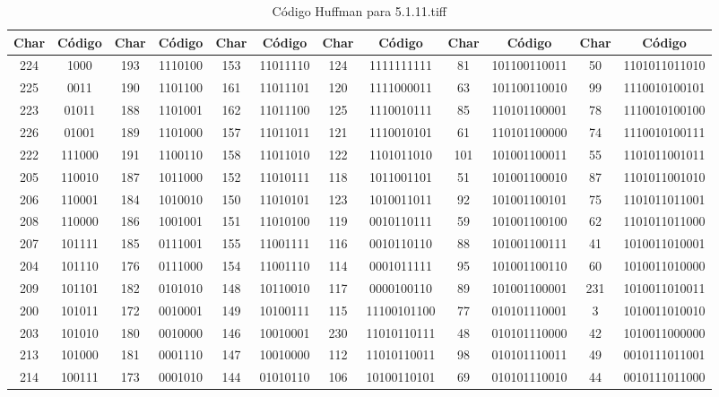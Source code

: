 \documentclass[conference,onecolumn,12pt]{IEEEtran}
\numberwithin{equation}{subsection}
\begin{document}
\begin{itemize}
    \begin{table}[H]
\centering
\caption{Código Huffman para 5.1.11.tiff}
\label{tab:huffman_5.1.11.tiff}
\begin{tabular}{cccccccccccc}
\toprule
\textbf{Char} & \textbf{Código} & \textbf{Char} & \textbf{Código} & \textbf{Char} & \textbf{Código} & \textbf{Char} & \textbf{Código} & \textbf{Char} & \textbf{Código} & \textbf{Char} & \textbf{Código} \\
\midrule
224 & 1000 & 193 & 1110100 & 153 & 11011110 & 124 & 1111111111 & 81 & 101100110011 & 50 & 1101011011010 \\
225 & 0011 & 190 & 1101100 & 161 & 11011101 & 120 & 1111000011 & 63 & 101100110010 & 99 & 1110010100101 \\
223 & 01011 & 188 & 1101001 & 162 & 11011100 & 125 & 1110010111 & 85 & 110101100001 & 78 & 1110010100100 \\
226 & 01001 & 189 & 1101000 & 157 & 11011011 & 121 & 1110010101 & 61 & 110101100000 & 74 & 1110010100111 \\
222 & 111000 & 191 & 1100110 & 158 & 11011010 & 122 & 1101011010 & 101 & 101001100011 & 55 & 1101011001011 \\
205 & 110010 & 187 & 1011000 & 152 & 11010111 & 118 & 1011001101 & 51 & 101001100010 & 87 & 1101011001010 \\
206 & 110001 & 184 & 1010010 & 150 & 11010101 & 123 & 1010011011 & 92 & 101001100101 & 75 & 1101011011001 \\
208 & 110000 & 186 & 1001001 & 151 & 11010100 & 119 & 0010110111 & 59 & 101001100100 & 62 & 1101011011000 \\
207 & 101111 & 185 & 0111001 & 155 & 11001111 & 116 & 0010110110 & 88 & 101001100111 & 41 & 1010011010001 \\
204 & 101110 & 176 & 0111000 & 154 & 11001110 & 114 & 0001011111 & 95 & 101001100110 & 60 & 1010011010000 \\
209 & 101101 & 182 & 0101010 & 148 & 10110010 & 117 & 0000100110 & 89 & 101001100001 & 231 & 1010011010011 \\
200 & 101011 & 172 & 0010001 & 149 & 10100111 & 115 & 11100101100 & 77 & 010101110001 & 3 & 1010011010010 \\
203 & 101010 & 180 & 0010000 & 146 & 10010001 & 230 & 11010110111 & 48 & 010101110000 & 42 & 1010011000000 \\
213 & 101000 & 181 & 0001110 & 147 & 10010000 & 112 & 11010110011 & 98 & 010101110011 & 49 & 0010111011001 \\
214 & 100111 & 173 & 0001010 & 144 & 01010110 & 106 & 10100110101 & 69 & 010101110010 & 44 & 0010111011000 \\

\end{tabular}
\end{table}
\end{itemize}
\end{document}
